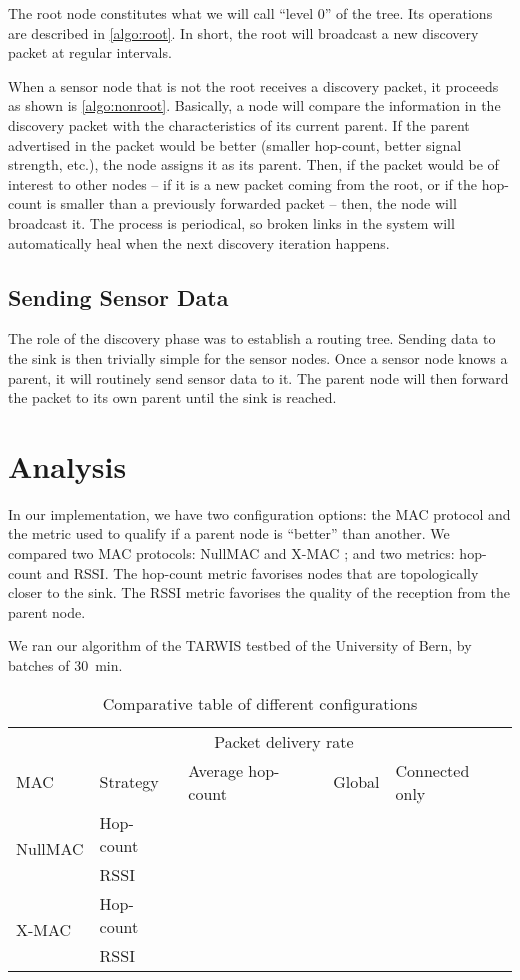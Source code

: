 \documentclass[a4paper]{llncs}
\begin{document}
The root node constitutes what we will call \enquote{level 0} of the tree.
Its operations are described in \autoref{algo:root}.
In short, the root will broadcast a new discovery packet at regular intervals.

When a sensor node that is not the root receives a discovery packet, it proceeds as shown is \autoref{algo:nonroot}.
Basically, a node will compare the information in the discovery packet with the characteristics of its current parent.
If the parent advertised in the packet would be better (smaller hop-count, better signal strength, etc.), the node assigns it as its parent.
Then, if the packet would be of interest to other nodes -- if it is a new packet coming from the root, or if the hop-count is smaller than a previously forwarded packet -- then, the node will broadcast it.
The process is periodical, so broken links in the system will automatically heal when the next discovery iteration happens.

\subsection{Sending Sensor Data}

The role of the discovery phase was to establish a routing tree.
Sending data to the sink is then trivially simple for the sensor nodes.
Once a sensor node knows a parent, it will routinely send sensor data to it.
The parent node will then forward the packet to its own parent until the sink is reached.

\section{Analysis}

In our implementation, we have two configuration options: the MAC protocol and the metric used to qualify if a parent node is \enquote{better} than another.
We compared two MAC protocols: NullMAC and X-MAC \autocite{xmac}; and two metrics: hop-count and RSSI.
The hop-count metric favorises nodes that are topologically closer to the sink.
The RSSI metric favorises the quality of the reception from the parent node.

We ran our algorithm of the TARWIS testbed of the University of Bern, by batches of \SI{30}{\minute}.



\begin{table}
\centering
\begin{tabular}{lllll}
\toprule
& & \multicolumn{2}{c}{Packet delivery rate} \\
\cmidrule{4-5}
MAC & Strategy & Average hop-count & Global & Connected only \\
\midrule
\multirow{2}{*}{NullMAC} & Hop-count & \\
& RSSI & \\
\multirow{2}{*}{X-MAC} & Hop-count & \\
& RSSI & \\
\bottomrule
\end{tabular}
\caption{Comparative table of different configurations}
\label{tab:comp}
\end{table}
\end{document}
